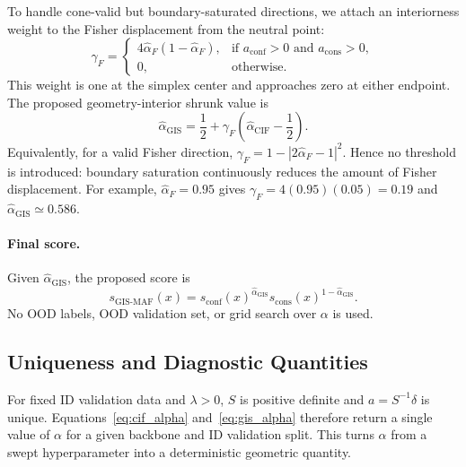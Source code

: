 To handle cone-valid but boundary-saturated directions, we attach an
interiorness weight to the Fisher displacement from the neutral point:
\begin{equation}
    \gamma_F
    =
    \begin{cases}
    4\hat{\alpha}_{F}(1-\hat{\alpha}_{F}),
    & \text{if } a_{\mathrm{conf}}>0
      \text{ and } a_{\mathrm{cons}}>0,\\
    0,
    & \text{otherwise.}
    \end{cases}
\end{equation}
This weight is one at the simplex center and approaches zero at either
endpoint.  The proposed geometry-interior shrunk value is
\begin{equation}
    \hat{\alpha}_{\mathrm{GIS}}
    =
    \frac{1}{2}
    +
    \gamma_F
    \left(\hat{\alpha}_{\mathrm{CIF}}-\frac{1}{2}\right).
    \label{eq:gis_alpha}
\end{equation}
Equivalently, for a valid Fisher direction,
$\gamma_F=1-|2\hat{\alpha}_{F}-1|^2$.  Hence no threshold is introduced:
boundary saturation continuously reduces the amount of Fisher displacement.
For example, $\hat{\alpha}_{F}=0.95$ gives
$\gamma_F=4(0.95)(0.05)=0.19$ and
$\hat{\alpha}_{\mathrm{GIS}}\simeq 0.586$.

\paragraph{Final score.}
Given $\hat{\alpha}_{\mathrm{GIS}}$, the proposed score is
\begin{equation}
    s_{\mathrm{GIS\text{-}MAF}}(x)
    =
    s_{\mathrm{conf}}(x)^{\hat{\alpha}_{\mathrm{GIS}}}
    s_{\mathrm{cons}}(x)^{1-\hat{\alpha}_{\mathrm{GIS}}}.
\end{equation}
No OOD labels, OOD validation set, or grid search over $\alpha$ is used.

\subsection{Uniqueness and Diagnostic Quantities}

For fixed ID validation data and $\lambda>0$, $S$ is positive definite and
$a=S^{-1}\delta$ is unique.  Equations~\eqref{eq:cif_alpha}
and~\eqref{eq:gis_alpha} therefore return a single value of $\alpha$ for a
given backbone and ID validation split.  This
turns $\alpha$ from a swept hyperparameter into a deterministic geometric
quantity.

